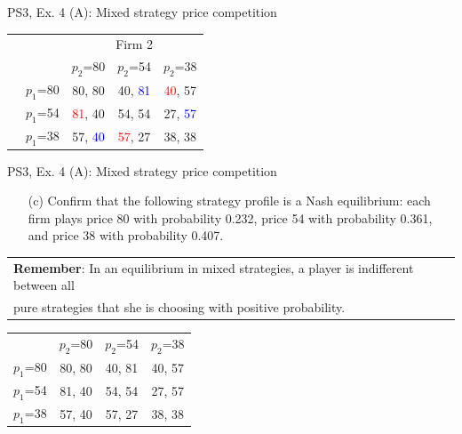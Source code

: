 \begin{frame}{PS3, Ex. 4 (A): Mixed strategy price competition}
    \vspace{-4pt}
    \begin{table}
      \begin{tabular}{cc|c|c|c|}
        & \multicolumn{1}{c}{} & \multicolumn{3}{c}{\color{blue}Firm 2}\\
        & \multicolumn{1}{c}{} & \multicolumn{1}{c}{$p_2$=80} & \multicolumn{1}{c}{$p_2$=54} & \multicolumn{1}{c}{$p_2$=38} \\\cline{3-5}
        \parbox[t]{1mm}{}
        & $p_1$=80 & 80, 80 & 40, \textcolor{blue}{81} & \textcolor{red}{40}, 57 \\
        & $p_1$=54 & \textcolor{red}{81}, 40 & 54, 54 & 27, \textcolor{blue}{57} \\
        & $p_1$=38 & 57, \textcolor{blue}{40} & \textcolor{red}{57}, 27 & 38, 38 \\
      \end{tabular}
    \end{table}
  \vfill\null
\end{frame}
\begin{frame}{PS3, Ex. 4 (A): Mixed strategy price competition}
    \begin{itemize}
      \item[(c)] Confirm that the following strategy profile is a Nash equilibrium: each firm plays price 80 with probability 0.232, price 54 with probability 0.361, and price 38 with probability 0.407.
    \end{itemize}
    \begin{tabular}{|l|}
      \cline{1-1}
      \textbf{Remember}: In an equilibrium in mixed strategies, a player is indifferent between all \\
      pure strategies that she is choosing with positive probability.\\\cline{1-1}
    \end{tabular}
    \begin{table}
      \begin{tabular}{c|c|c|c|}
        \multicolumn{1}{c}{} & \multicolumn{1}{c}{$p_2$=80} & \multicolumn{1}{c}{$p_2$=54} & \multicolumn{1}{c}{$p_2$=38} \\\cline{2-4}
        $p_1$=80 & 80, 80 & 40, 81 & 40, 57 \\\cline{2-4}
        $p_1$=54 & 81, 40 & 54, 54 & 27, 57 \\\cline{2-4}
        $p_1$=38 & 57, 40 & 57, 27 & 38, 38 \\\cline{2-4}
      \end{tabular}
    \end{table}
  \vfill\null
\end{frame}
